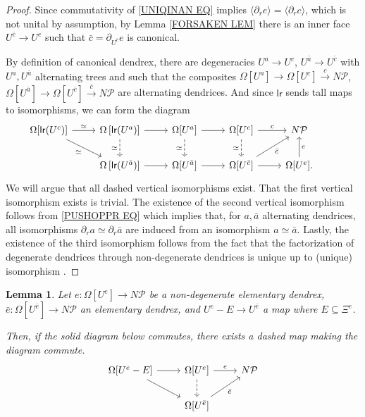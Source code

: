\documentclass[a4paper,10pt]{article}%
\numberwithin{equation}{section}
\numberwithin{figure}{section}
\newtheorem{lemma}[equation]{Lemma}%
\theoremstyle{definition} %
\newcommand{\1}{\ensuremath{\mathbbm 1}}%
\begin{document}
\begin{proof}
	Since commutativity of \eqref{UNIQINAN EQ} implies
	$\langle \partial_r e \rangle =
	\langle \partial_r c \rangle$,
	which is not unital by assumption, 
	by Lemma \ref{FORSAKEN LEM} there is an inner face $U^{\bar{c}} \to U^{e}$
	such that $\bar{c} = \partial_{U^{\bar{c}}} e$ is canonical.
	
	By definition of canonical dendrex, there are
	degeneracies
	$U^a \to U^c$,
	$U^{\bar{a}} \to U^{\bar{c}}$
	with $U^a,U^{\bar{a}}$
	alternating trees
	and such that the composites 
	$\Omega[U^a] \to \Omega[U^c] \xrightarrow{c} N \mathcal{P}$,
	$\Omega[U^{\bar{a}}] \to \Omega[U^{\bar{c}}] \xrightarrow{\bar{c}} N \mathcal{P}$  
	are alternating dendrices. And since $\mathsf{lr}$ sends tall maps to isomorphisms, we can form the diagram
	\[
	\begin{tikzcd}
	\Omega[\mathsf{lr}(U^c)] \ar{r}{\simeq} \ar{rd}[swap]{\simeq} &
	\Omega\left[\mathsf{lr}(U^a)\right] \ar[dashed]{d}[swap]{\simeq} \ar{r} &
	\Omega[U^a] \ar[dashed]{d}[swap]{\simeq} \ar{r} &
	\Omega[U^c] \ar{r}{c} \ar[dashed]{d}[swap]{\simeq} &
	N \mathcal{P}
	\\
	&
	\Omega\left[\mathsf{lr}(U^{\bar{a}})\right] \ar{r} &
	\Omega[U^{\bar{a}}] \ar{r} &
	\Omega[U^{\bar{c}}] \ar{ru}[swap]{\bar c} \ar{r} &
	\Omega[U^{e}] \ar{u}[swap]{e}. &
	\end{tikzcd}
	\]
	We will argue that all dashed vertical isomorphisms exist.
	That the first vertical isomorphism exists is trivial.
	The existence of the second vertical isomorphism follows from
	\eqref{PUSHOPPR EQ} which implies that, for $a,\bar{a}$ alternating dendrices, all isomorphisms 
	$\partial_r a \simeq \partial_r \bar{a}$
	are induced from an isomorphism $a \simeq \bar{a}$.
	Lastly, the existence of the third isomorphism follows 
	from the fact that the factorization of degenerate dendrices through non-degenerate dendrices is unique up to (unique) isomorphism \cite[Prop. 5.62]{Per18}.
\end{proof}



\begin{lemma}\label{UNIQINAN2 LEM}
	Let 
	$e \colon \Omega[U^e] \to N \mathcal{P}$ 
	be a non-degenerate elementary dendrex,
	$\bar{e} \colon \Omega[U^{\bar{e}}] \to N \mathcal{P}$
	an elementary dendrex,
	and 
	$U^e-E \to U^{\bar{e}}$ a map where $E \subseteq \Xi^e$.
	
	Then, 
	if the solid diagram below commutes, there exists a dashed map making the diagram commute.
	\begin{equation}\label{UNIQINAN2 EQ}
	\begin{tikzcd}
	\Omega[U^e-E] \ar{r} \ar{rd}&
	\Omega[U^e] \ar{r}{e} \ar[dashed]{d} &
	N \mathcal{P}
	\\
	&
	\Omega[U^{\bar{e}}] \ar{ru}[swap]{\bar{e}} 
	\end{tikzcd}
	\end{equation}
\end{lemma}
\end{document}
